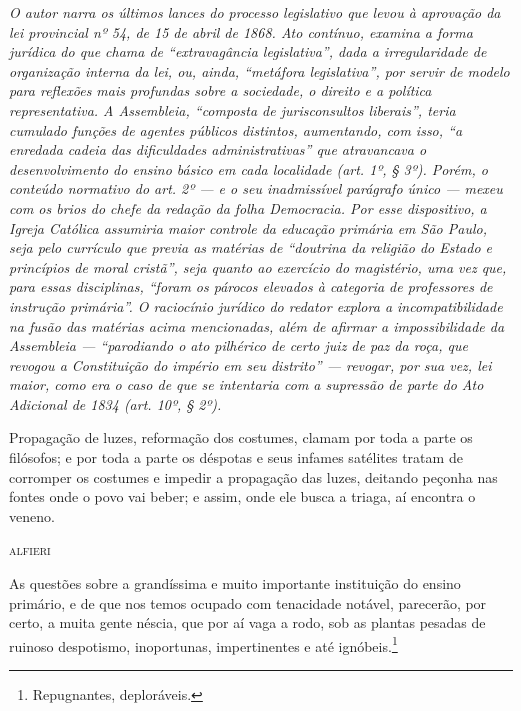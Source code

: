 \begin{didascalia}\itshape
O autor narra os últimos lances do processo legislativo que levou à
aprovação da lei provincial nº 54, de 15 de abril de 1868. Ato contínuo, examina
a forma jurídica do que chama de ``extravagância legislativa'', dada a
irregularidade de organização interna da lei, ou, ainda, ``metáfora
legislativa'', por servir de modelo para reflexões mais profundas sobre a
sociedade, o direito e a política representativa. A Assembleia,
``composta de jurisconsultos liberais'', teria cumulado funções de agentes
públicos distintos, aumentando, com isso, ``a enredada cadeia das
dificuldades administrativas'' que atravancava o desenvolvimento do
ensino básico em cada localidade (art. 1º, § 3º). Porém, o conteúdo
normativo do art. 2º --- e o seu inadmissível parágrafo único --- mexeu
com os brios do chefe da redação da folha \textnormal{Democracia}. Por esse
dispositivo, a Igreja Católica assumiria maior controle da educação
primária em São Paulo, seja pelo currículo que previa as matérias de
``doutrina da religião do Estado e princípios de moral cristã'', seja
quanto ao exercício do magistério, uma vez que, para essas disciplinas,
``foram os párocos elevados à categoria de professores de instrução
primária''. O raciocínio jurídico do redator explora a incompatibilidade
na fusão das matérias acima mencionadas, além de afirmar a
impossibilidade da Assembleia --- ``parodiando o ato pilhérico de certo
juiz de paz da roça, que revogou a Constituição do império em seu
distrito'' --- revogar, por sua vez, lei maior, como era o caso de que se
intentaria com a supressão de parte do Ato Adicional de 1834 (art. 10º,
§ 2º).
\end{didascalia}\pagebreak



\epigraph{Propagação de luzes, reformação dos costumes, clamam por toda a parte os
filósofos; e por toda a parte os déspotas e seus infames satélites
tratam de corromper os costumes e impedir a propagação das luzes,
deitando peçonha nas fontes onde o povo vai beber; e assim, onde ele
busca a triaga,\footnotemark{} aí encontra o veneno.}{\textsc{alfieri}\footnotemark}



As questões sobre a grandíssima e muito importante instituição do ensino
primário, e de que nos temos ocupado com tenacidade notável, parecerão,
por certo, a muita gente néscia, que por aí vaga a rodo, sob as plantas
pesadas de ruinoso despotismo, inoportunas, impertinentes e até
ignóbeis.\footnote{Repugnantes, deploráveis.}

